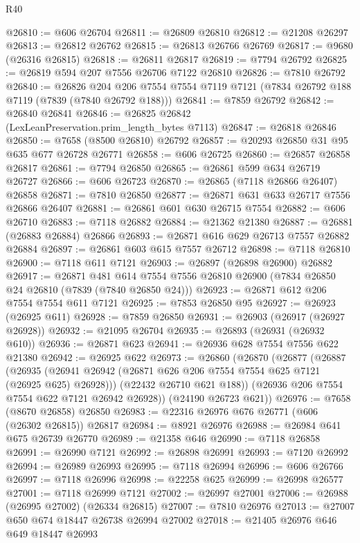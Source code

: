 \begin{lexlean}{R40}
\begin{coremodule}
@26810 := @606 @26704
@26811 := @26809 @26810
@26812 := @21208 @26297
@26813 := @26812 @26762
@26815 := @26813 @26766 @26769
@26817 := @9680 (@26316 @26815)
@26818 := @26811 @26817
@26819 := @7794 @26792
@26825 := @26819 @594 @207 @7556 @26706 @7122 @26810
@26826 := @7810 @26792
@26840 := @26826
    @204
    @206
    @7554
    @7554
    @7119
    @7121
    (@7834 @26792 @188 @7119 (@7839 (@7840 @26792 @188)))
@26841 := @7859 @26792
@26842 := @26840 @26841
@26846 := @26825 @26842 (LexLeanPreservation.prim_length_bytes @7113)
@26847 := @26818 @26846
@26850 := @7658 (@8500 @26810) @26792
@26857 := @20293 @26850 @31 @95 @635 @677 @26728 @26771
@26858 := @606 @26725
@26860 := @26857 @26858 @26817
@26861 := @7794 @26850
@26865 := @26861 @599 @634 @26719 @26727
@26866 := @606 @26723
@26870 := @26865 (@7118 @26866 @26407) @26858
@26871 := @7810 @26850
@26877 := @26871 @631 @633 @26717 @7556 @26866 @26407
@26881 := @26861 @601 @630 @26715 @7554
@26882 := @606 @26710
@26883 := @7118 @26882
@26884 := @21362 @21380
@26887 := @26881 (@26883 @26884) @26866
@26893 := @26871 @616 @629 @26713 @7557 @26882 @26884
@26897 := @26861 @603 @615 @7557 @26712
@26898 := @7118 @26810
@26900 := @7118 @611 @7121
@26903 := @26897 (@26898 @26900) @26882
@26917 := @26871
    @481
    @614
    @7554
    @7556
    @26810
    @26900
    (@7834 @26850 @24 @26810 (@7839 (@7840 @26850 @24)))
@26923 := @26871 @612 @206 @7554 @7554 @611 @7121
@26925 := @7853 @26850 @95
@26927 := @26923 (@26925 @611)
@26928 := @7859 @26850
@26931 := @26903 (@26917 (@26927 @26928))
@26932 := @21095 @26704
@26935 := @26893 (@26931 (@26932 @610))
@26936 := @26871 @623
@26941 := @26936 @628 @7554 @7556 @622 @21380
@26942 := @26925 @622
@26973 := @26860
    (@26870
      (@26877
        (@26887
          (@26935 (@26941 @26942 (@26871 @626 @206 @7554 @7554 @625 @7121 (@26925 @625) @26928)))
          (@22432 @26710 @621 @188))
        (@26936 @206 @7554 @7554 @622 @7121 @26942 @26928))
      (@24190 @26723 @621))
@26976 := @7658 (@8670 @26858) @26850
@26983 := @22316 @26976 @676 @26771 (@606 (@26302 @26815)) @26817
@26984 := @8921 @26976
@26988 := @26984 @641 @675 @26739 @26770
@26989 := @21358 @646
@26990 := @7118 @26858
@26991 := @26990 @7121
@26992 := @26898 @26991
@26993 := @7120 @26992
@26994 := @26989 @26993
@26995 := @7118 @26994
@26996 := @606 @26766
@26997 := @7118 @26996
@26998 := @22258 @625
@26999 := @26998 @26577
@27001 := @7118 @26999 @7121
@27002 := @26997 @27001
@27006 := @26988 (@26995 @27002) (@26334 @26815)
@27007 := @7810 @26976
@27013 := @27007 @650 @674 @18447 @26738 @26994 @27002
@27018 := @21405 @26976 @646 @649 @18447 @26993

\end{coremodule}
\end{lexlean}
